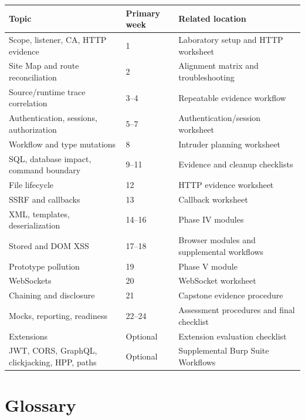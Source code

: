 \documentclass[11pt]{article}
\begin{document}
\begin{longtable}{@{}L{0.31\textwidth}L{0.20\textwidth}L{0.39\textwidth}@{}}
\toprule
\textbf{Topic} & \textbf{Primary week} & \textbf{Related location} \\
\midrule
Scope, listener, CA, HTTP evidence & 1 & Laboratory setup and HTTP worksheet \\
Site Map and route reconciliation & 2 & Alignment matrix and troubleshooting \\
Source/runtime trace correlation & 3--4 & Repeatable evidence workflow \\
Authentication, sessions, authorization & 5--7 & Authentication/session worksheet \\
Workflow and type mutations & 8 & Intruder planning worksheet \\
SQL, database impact, command boundary & 9--11 & Evidence and cleanup checklists \\
File lifecycle & 12 & HTTP evidence worksheet \\
SSRF and callbacks & 13 & Callback worksheet \\
XML, templates, deserialization & 14--16 & Phase IV modules \\
Stored and DOM XSS & 17--18 & Browser modules and supplemental workflows \\
Prototype pollution & 19 & Phase V module \\
WebSockets & 20 & WebSocket worksheet \\
Chaining and disclosure & 21 & Capstone evidence procedure \\
Mocks, reporting, readiness & 22--24 & Assessment procedures and final checklist \\
Extensions & Optional & Extension evaluation checklist \\
JWT, CORS, GraphQL, clickjacking, HPP, paths & Optional & Supplemental Burp Suite Workflows \\
\bottomrule
\end{longtable}

\section{Glossary}
\end{document}
